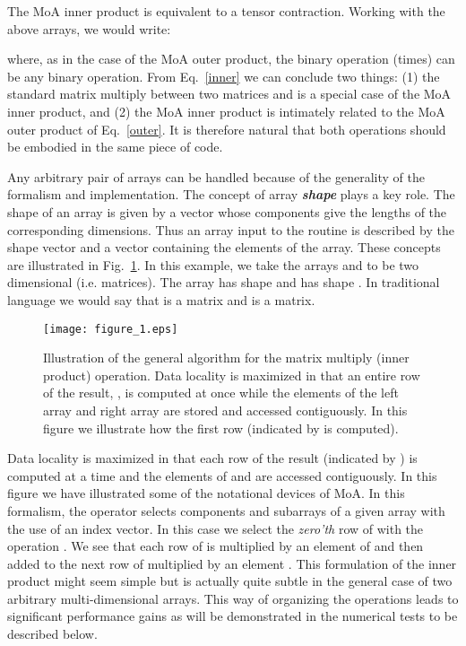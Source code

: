 \documentclass[aps,prl,twocolumn,groupedaddress,floatfix]{revtex4}
\begin{document}
The MoA inner product is equivalent to a tensor contraction.  Working with 
the above arrays, we would write: 

where, as in the case of the MoA outer product, the binary operation 
(times) can be any binary operation.  From Eq.~\ref{inner} we can 
conclude two things: (1) the standard matrix multiply between two 
matrices  and  is a special case of the MoA inner product, and 
(2) the MoA inner product is intimately related to the MoA outer product
of Eq.~\ref{outer}.  It is therefore natural that both operations should 
be embodied in the same piece of code.

Any arbitrary pair of arrays can be handled because of the generality of
the formalism and implementation.  The concept of array {\bf \em shape}
plays a key role.  The shape of an array is given by a vector whose
components give the lengths of the corresponding dimensions.  Thus an 
array input to the routine is described by the shape vector and a 
vector containing the elements of the array.  These concepts are illustrated
in Fig.~\ref{inner_fig}.  In this example, we take the arrays  and  to be
two dimensional (i.e. matrices).  The array  has shape 
 and  has shape .  In traditional
language we would say that  is a  matrix and  is 
a  matrix.

\begin{figure}
\texttt{[image: figure\_1.eps]}\caption{
\label{inner_fig}
Illustration of the general algorithm for the matrix multiply
(inner product) operation.  Data locality is maximized in that
an entire row of the result, ,  is computed at once while the elements
of the left array  and right array  are stored and accessed 
contiguously.  In this figure we illustrate how the first row (indicated
by  is computed).
}
\end{figure}

Data locality is maximized in that each row of the result (indicated by
) is computed at a time and the elements of  and 
are accessed contiguously.  In this figure we have illustrated some of the
notational devices of MoA.  In this formalism, the  operator selects
components and subarrays of a given array with the use of an index vector.
In this case we select the {\em zero'th} row of  with the operation
.  We see that each row of  is multiplied by an element of 
 and then added to the next row of  multiplied by an element .
This formulation of the inner product might seem simple but is actually 
quite subtle in the general case of two arbitrary multi-dimensional arrays.
This way of organizing the operations leads to significant performance
gains as will be demonstrated in the numerical tests to be described below.
\end{document}
